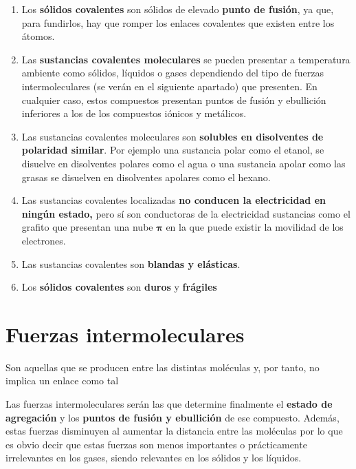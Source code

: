 \begin{enumerate}[label=\numberballmDarkTeal]
        \item Los \textbf{sólidos covalentes} son sólidos de elevado \textbf{punto de fusión}, ya que, para fundirlos, hay que romper los enlaces covalentes que existen entre los átomos.
        \item Las \textbf{sustancias covalentes moleculares}  se pueden presentar a temperatura ambiente como sólidos, líquidos o gases dependiendo del tipo de fuerzas intermoleculares (se verán en el siguiente apartado) que presenten.
        En cualquier caso, estos compuestos presentan puntos de fusión y ebullición inferiores a los de los compuestos iónicos y metálicos.
        \item Las sustancias covalentes moleculares son \textbf{solubles en disolventes de polaridad similar}.
        Por ejemplo una sustancia polar como el etanol, se disuelve en disolventes polares como el agua o una sustancia apolar como las grasas se disuelven en disolventes apolares como el hexano.
        \item Las sustancias covalentes localizadas \textbf{no conducen la electricidad en ningún estado,} pero sí son conductoras de la electricidad sustancias como el grafito que presentan una nube \(\bm{\pi}\) en la que puede existir la movilidad de los electrones.
        \item Las sustancias covalentes son \textbf{blandas y elásticas}.
        \item Los \textbf{sólidos covalentes} son \textbf{duros} y \textbf{frágiles}
\end{enumerate}


\section{Fuerzas intermoleculares}\label{sec:fuerzas-intermoleculares}

\begin{center}
    \begin{definition}
        Son aquellas que se producen entre las distintas moléculas y, por tanto, no implica un enlace como tal
    \end{definition}
\end{center}


Las fuerzas intermoleculares serán las que determine finalmente el \textbf{estado de agregación} y los \textbf{puntos de fusión y ebullición} de ese compuesto.
Además, estas fuerzas disminuyen al aumentar la distancia entre las moléculas por lo que es obvio decir que estas fuerzas son menos importantes o prácticamente irrelevantes en los gases, siendo relevantes en los sólidos y los líquidos.

